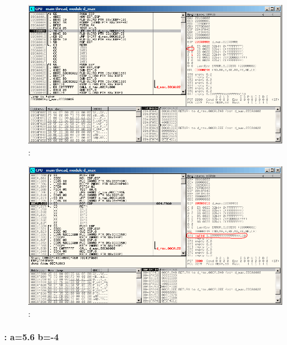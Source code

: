 \begin{figure}[H]
\centering
\includegraphics[scale=\FigScale]{patterns/12_FPU/3_comparison/x86/MSVC/olly1_4.png}
\caption{\olly: \TEST {}}
\label{fig:FPU_comparison_case1_olly4}
\end{figure}

\begin{figure}[H]
\centering
\includegraphics[scale=\FigScale]{patterns/12_FPU/3_comparison/x86/MSVC/olly1_5.png}
\caption{\olly: }
\label{fig:FPU_comparison_case1_olly5}
\end{figure}

\paragraph{: a=5.6 \AndENRU b=-4}

